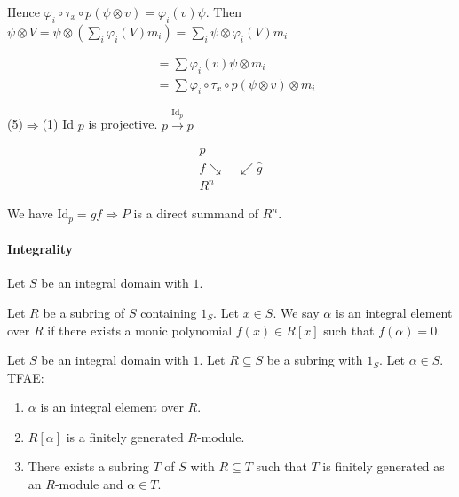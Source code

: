 \documentclass[11pt, a4paper]{report}
\begin{document}
Hence $\varphi_{i} \circ \tau_{x} \circ p(\psi \otimes v)=\varphi_{i}(v) \psi$. Then $\psi \otimes V=\psi \otimes\left(\sum_{i} \varphi_{i}(V) m_{i}\right)=\sum_{i} \psi \otimes \varphi_{i}(V) m_{i}$

\[
\begin{aligned}
& =\sum \varphi_{i}(v) \psi \otimes m_{i} \\
& =\sum \varphi_{i} \circ \tau_{x} \circ p(\psi \otimes v) \otimes m_{i}
\end{aligned}
\]

(5)$\Rightarrow$(1) Id $p$ is projective. $p \xrightarrow{\mathrm{Id}_p} p$

\[
\begin{array}{c}
p \\
f \searrow \quad \swarrow \hat{g} \\
R^{n}
\end{array}
\]

We have $\mathrm{Id}_p = gf \Rightarrow P$ is a direct summand of $R^{n}$.


\paragraph{Integrality}

Let $S$ be an integral domain with $1$.

\begin{definition}
Let $R$ be a subring of $S$ containing $1_S$. Let $x \in S$. We say $\alpha$ is an integral element over $R$ if there exists a monic polynomial $f(x) \in R[x]$ such that $f(\alpha)=0$.
\end{definition}

\begin{proposition}
Let $S$ be an integral domain with $1$. Let $R \subseteq S$ be a subring with $1_S$. Let $\alpha \in S$. TFAE:
\begin{enumerate}
\item $\alpha$ is an integral element over $R$.
\item $R[\alpha]$ is a finitely generated $R$-module.
\item There exists a subring $T$ of $S$ with $R \subseteq T$ such that $T$ is finitely generated as an $R$-module and $\alpha \in T$.
\end{enumerate}
\end{proposition}
\end{document}

